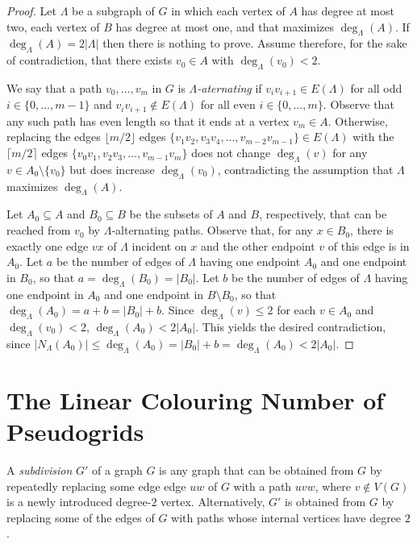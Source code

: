 \documentclass{patmorin}
\begin{document}
\begin{proof}
  Let $\Lambda$ be a subgraph of $G$ in which each vertex of $A$ has degree at most two, each vertex of $B$ has degree at most one, and that maximizes $\deg_\Lambda(A)$.  If $\deg_{\Lambda}(A) = 2|\Lambda|$ then there is nothing to prove. Assume therefore, for the sake of contradiction,  that there exists $v_0\in A$ with $\deg_\Lambda(v_0) < 2$.

  We say that a path $v_0,\ldots,v_m$ in $G$ is \emph{$\Lambda$-aternating} if $v_iv_{i+1}\in E(\Lambda)$ for all odd $i\in\{0,\ldots,m-1\}$ and $v_iv_{i+1}\not\in E(\Lambda)$ for all even $i\in\{0,\ldots,m\}$.  Observe that any such path has even length so that it ends at a vertex $v_m\in A$.  Otherwise, replacing the edges $\lfloor m/2\rfloor$ edges $\{v_1v_2,v_3v_4,\ldots,v_{m-2}v_{m-1}\}\in E(\Lambda)$ with the $\lceil m/2\rceil$ edges $\{v_0v_1,v_2v_3,\ldots,v_{m-1}v_m\}$ does not change $\deg_\Lambda(v)$ for any $v\in A_0\setminus\{v_0\}$ but does increase  $\deg_\Lambda(v_0)$, contradicting the assumption that $\Lambda$ maximizes $\deg_\Lambda(A)$.

  Let $A_0\subseteq A$ and $B_0\subseteq B$ be the subsets of $A$ and $B$, respectively, that can be reached from $v_0$ by $\Lambda$-alternating paths.
  Observe that, for any $x\in B_0$,  there is exactly one edge $vx$ of $\Lambda$ incident on $x$ and the other endpoint $v$ of this edge is in $A_0$.  Let $a$ be the number of edges of $\Lambda$ having one endpoint $A_0$ and one endpoint in $B_0$, so that $a=\deg_\Lambda(B_0)=|B_0|$.  Let $b$ be the number of edges of $\Lambda$ having one endpoint in $A_0$ and one endpoint in $B\setminus B_0$, so that $\deg_\Lambda(A_0)=a+b = |B_0|+b$.    Since $\deg_{\Lambda}(v) \le 2$ for each $v\in A_0$ and $\deg_\Lambda(v_0)<2$, $\deg_\Lambda(A_0)<2|A_0|$.  This yields the desired contradiction, since $|N_\Lambda(A_0)| \le \deg_\Lambda(A_0) = |B_0|+b = \deg_\Lambda(A_0)< 2|A_0|$.
\end{proof}


\section{The Linear Colouring Number of Pseudogrids}

A \emph{subdivision} $G'$ of a graph $G$ is any graph that can be obtained from $G$ by repeatedly replacing some edge edge $uw$ of $G$ with a path $uvw$, where $v\not\in V(G)$ is a newly introduced degree-$2$ vertex.  Alternatively, $G'$ is obtained from $G$ by replacing some of the edges of $G$ with paths whose internal vertices have degree $2$.
\end{document}
